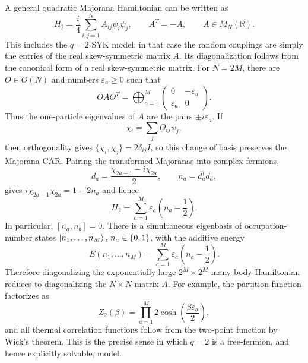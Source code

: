 \documentclass[11pt]{article}
\numberwithin{equation}{section}
\theoremstyle{exposition}
\theoremstyle{result}
\newcommand{\R}{\mathbb R}
\begin{document}
A general quadratic Majorana Hamiltonian can be written as
\begin{equation*}
H_2=\frac i4\sum_{i,j=1}^{N}A_{ij}\psi_i\psi_j,
\qquad
A^T=-A,
\qquad A\in M_N(\R).
\end{equation*}
This includes the $q=2$ SYK model: in that case the random couplings are simply the entries of the real skew-symmetric matrix $A$.  Its diagonalization follows from the canonical form of a real skew-symmetric matrix.  For $N=2M$, there are $O\in O(N)$ and numbers $\varepsilon_a\geq0$ such that
\begin{equation}
OAO^T=
\bigoplus_{a=1}^{M}
\begin{pmatrix}
0&-\varepsilon_a\\
\varepsilon_a&0
\end{pmatrix}.
\label{eq:skewCanonical}
\end{equation}
Thus the one-particle eigenvalues of $A$ are the pairs $\pm i\varepsilon_a$.  If
\begin{equation*}
\chi_i=\sum_jO_{ij}\psi_j,
\end{equation*}
then orthogonality gives $\{\chi_i,\chi_j\}=2\delta_{ij}I$, so this change of basis preserves the Majorana CAR.  Pairing the transformed Majoranas into complex fermions,
\begin{equation*}
d_a=\frac{\chi_{2a-1}-i\chi_{2a}}2,
\qquad n_a=d_a^\dagger d_a,
\end{equation*}
gives $i\chi_{2a-1}\chi_{2a}=1-2n_a$ and hence
\begin{equation}
H_2=\sum_{a=1}^{M}\varepsilon_a
\left(n_a-\frac12\right).
\label{eq:freeFermionDiagonal}
\end{equation}
In particular, $[n_a,n_b]=0$.  There is a simultaneous eigenbasis of occupation-number states $\ket{n_1,\ldots,n_M}, \, n_a\in\{0,1\}$, with the additive energy
\begin{equation*}
E(n_1,\ldots,n_M)
=\sum_{a=1}^{M}\varepsilon_a
\left(n_a-\frac12\right).
\end{equation*}
Therefore diagonalizing the exponentially large $2^M\times2^M$ many-body Hamiltonian reduces to diagonalizing the $N\times N$ matrix $A$.  For example, the partition function factorizes as
\begin{equation*}
Z_2(\beta)=\prod_{a=1}^{M}
2\cosh\left(\frac{\beta\varepsilon_a}{2}\right),
\end{equation*}
and all thermal correlation functions follow from the two-point function by Wick's theorem.  This is the precise sense in which $q=2$ is a free-fermion, and hence explicitly solvable, model.
\end{document}
